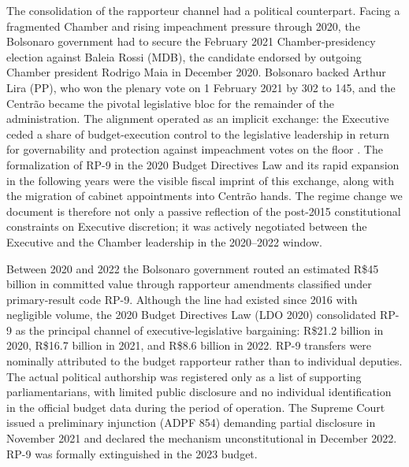 \documentclass[pdflatex,sn-basic]{sn-jnl}
\begin{document}
The consolidation of the rapporteur channel had a political counterpart. Facing a fragmented Chamber and rising impeachment pressure through 2020, the Bolsonaro government had to secure the February 2021 Chamber-presidency election against Baleia Rossi (MDB), the candidate endorsed by outgoing Chamber president Rodrigo Maia in December 2020. Bolsonaro backed Arthur Lira (PP), who won the plenary vote on 1 February 2021 by 302 to 145, and the Centr\~ao became the pivotal legislative bloc for the remainder of the administration. The alignment operated as an implicit exchange: the Executive ceded a share of budget-execution control to the legislative leadership in return for governability and protection against impeachment votes on the floor \citep{GrazianeEtAl2022RP9,BrazilReports2022SecretBudget}. The formalization of RP-9 in the 2020 Budget Directives Law and its rapid expansion in the following years \citep{TCU2022RelatorioContas} were the visible fiscal imprint of this exchange, along with the migration of cabinet appointments into Centr\~ao hands. The regime change we document is therefore not only a passive reflection of the post-2015 constitutional constraints on Executive discretion; it was actively negotiated between the Executive and the Chamber leadership in the 2020--2022 window.

Between 2020 and 2022 the Bolsonaro government routed an estimated R\$45 billion in committed value through rapporteur amendments classified under primary-result code RP-9. Although the line had existed since 2016 with negligible volume, the 2020 Budget Directives Law (LDO 2020) consolidated RP-9 as the principal channel of executive-legislative bargaining: R\$21.2 billion in 2020, R\$16.7 billion in 2021, and R\$8.6 billion in 2022. RP-9 transfers were nominally attributed to the budget rapporteur rather than to individual deputies. The actual political authorship was registered only as a list of supporting parliamentarians, with limited public disclosure and no individual identification in the official budget data during the period of operation. The Supreme Court issued a preliminary injunction (ADPF 854) demanding partial disclosure in November 2021 and declared the mechanism unconstitutional in December 2022. RP-9 was formally extinguished in the 2023 budget.
\end{document}
